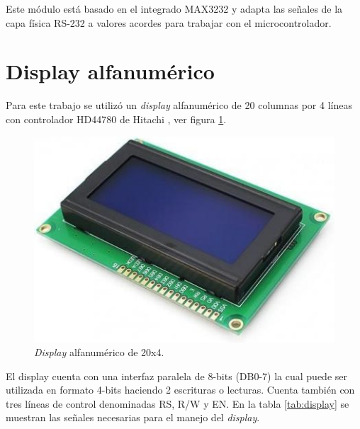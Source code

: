 Este módulo está basado en el integrado MAX3232 \citep{MAX3232} y adapta las señales de la capa física RS-232 a valores acordes para trabajar con el microcontrolador.

\section{Display alfanumérico}

Para este trabajo se utilizó un \textit{display} alfanumérico de 20 columnas por 4 líneas con controlador HD44780 de Hitachi \citep{HD44780}, ver figura \ref{fig:display}.

\begin{figure}[htpb]
	\centering
	\includegraphics[scale=0.7]{./Figures/display.jpg}
	\caption{\textit{Display} alfanumérico de 20x4.}
	\label{fig:display}
\end{figure}

El display cuenta con una interfaz paralela de 8-bits (DB0-7) la cual puede ser utilizada en formato 4-bits haciendo 2 escrituras o lecturas. Cuenta también con tres líneas de control denominadas RS, R/W y EN. En la tabla \ref{tab:display} se muestran las señales necesarias para el manejo del \textit{display}.

